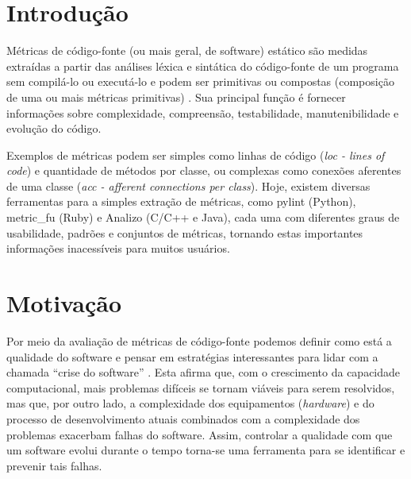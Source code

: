 \documentclass[12pt]{article}
\begin{document}
\newpage

\section{Introdução} \label{sec:intro}
Métricas de código-fonte (ou mais geral, de software) estático são medidas extraídas a partir das análises léxica e sintática do código-fonte de um programa sem compilá-lo ou executá-lo e podem ser primitivas ou compostas (composição de uma ou mais métricas primitivas) \cite{m13}. Sua principal função é fornecer informações sobre complexidade, compreensão, testabilidade, manutenibilidade e evolução do código\cite{m13}.

Exemplos de métricas podem ser simples como linhas de código (\textit{loc - lines of code}) e quantidade de métodos por classe, ou complexas como conexões aferentes de uma classe (\textit{acc - afferent connections per class}).
Hoje, existem diversas ferramentas para a simples extração de métricas, como pylint (Python), metric\_fu (Ruby) e Analizo (C/C++ e Java), cada uma com diferentes graus de usabilidade, padrões e conjuntos de métricas, tornando estas importantes informações inacessíveis para muitos usuários.

\section{Motivação}
Por meio da avaliação de métricas de código-fonte podemos definir como está a qualidade do software e pensar em estratégias interessantes para lidar com a chamada ``crise do software'' \cite{nr68}. Esta afirma que, com o crescimento da capacidade computacional, mais problemas difíceis se tornam viáveis para serem resolvidos, mas que, por outro lado, a complexidade dos equipamentos (\textit{hardware}) e do processo de desenvolvimento atuais combinados com a complexidade dos problemas exacerbam falhas do software. Assim, controlar a qualidade com que um software evolui durante o tempo torna-se uma ferramenta para se identificar e prevenir tais falhas.
\end{document}
